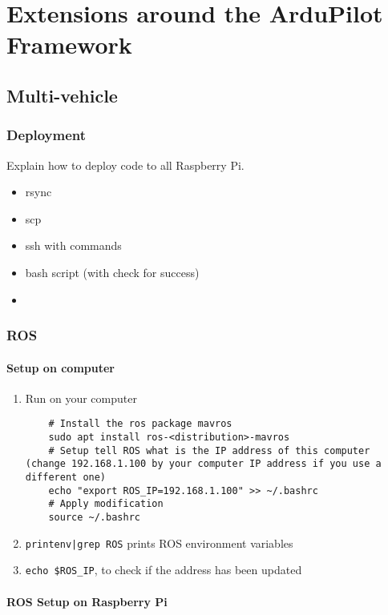 \chapter{Extensions around the ArduPilot Framework}

\section{Multi-vehicle}

\subsection{Deployment}
Explain how to deploy code to all Raspberry Pi.
\begin{itemize}
    \item rsync
    \item scp
    \item ssh with commands
    \item bash script (with check for success)
    \item
\end{itemize}

\subsection{ROS}
\subsubsection{Setup on computer}
\begin{enumerate}
    \item Run on your computer

          \begin{verbatim}
    # Install the ros package mavros
    sudo apt install ros-<distribution>-mavros
    # Setup tell ROS what is the IP address of this computer (change 192.168.1.100 by your computer IP address if you use a different one)
    echo "export ROS_IP=192.168.1.100" >> ~/.bashrc
    # Apply modification
    source ~/.bashrc
                    \end{verbatim}
    \item \texttt{printenv|grep ROS} prints ROS environment variables
    \item \texttt{echo \$ROS\_IP}, to check if the address has been updated
\end{enumerate}

\subsubsection{ROS Setup on Raspberry Pi}

